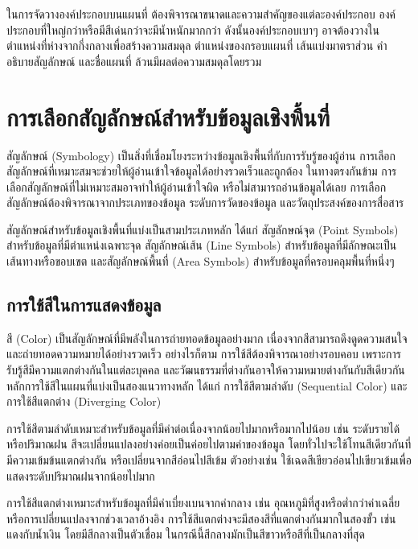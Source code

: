 ในการจัดวางองค์ประกอบบนแผนที่ ต้องพิจารณาขนาดและความสำคัญของแต่ละองค์ประกอบ องค์ประกอบที่ใหญ่กว่าหรือมีสีเด่นกว่าจะมีน้ำหนักมากกว่า ดังนั้นองค์ประกอบเบาๆ อาจต้องวางในตำแหน่งที่ห่างจากกึ่งกลางเพื่อสร้างความสมดุล ตำแหน่งของกรอบแผนที่ เส้นแบ่งมาตราส่วน คำอธิบายสัญลักษณ์ และชื่อแผนที่ ล้วนมีผลต่อความสมดุลโดยรวม

\section{การเลือกสัญลักษณ์สำหรับข้อมูลเชิงพื้นที่}

สัญลักษณ์ (Symbology) เป็นสิ่งที่เชื่อมโยงระหว่างข้อมูลเชิงพื้นที่กับการรับรู้ของผู้อ่าน การเลือกสัญลักษณ์ที่เหมาะสมจะช่วยให้ผู้อ่านเข้าใจข้อมูลได้อย่างรวดเร็วและถูกต้อง ในทางตรงกันข้าม การเลือกสัญลักษณ์ที่ไม่เหมาะสมอาจทำให้ผู้อ่านเข้าใจผิด หรือไม่สามารถอ่านข้อมูลได้เลย การเลือกสัญลักษณ์ต้องพิจารณาจากประเภทของข้อมูล ระดับการวัดของข้อมูล และวัตถุประสงค์ของการสื่อสาร

สัญลักษณ์สำหรับข้อมูลเชิงพื้นที่แบ่งเป็นสามประเภทหลัก ได้แก่ สัญลักษณ์จุด (Point Symbols) สำหรับข้อมูลที่มีตำแหน่งเฉพาะจุด สัญลักษณ์เส้น (Line Symbols) สำหรับข้อมูลที่มีลักษณะเป็นเส้นทางหรือขอบเขต และสัญลักษณ์พื้นที่ (Area Symbols) สำหรับข้อมูลที่ครอบคลุมพื้นที่หนึ่งๆ

\subsection{การใช้สีในการแสดงข้อมูล}

สี (Color) เป็นสัญลักษณ์ที่มีพลังในการถ่ายทอดข้อมูลอย่างมาก เนื่องจากสีสามารถดึงดูดความสนใจและถ่ายทอดความหมายได้อย่างรวดเร็ว อย่างไรก็ตาม การใช้สีต้องพิจารณาอย่างรอบคอบ เพราะการรับรู้สีมีความแตกต่างกันในแต่ละบุคคล และวัฒนธรรมที่ต่างกันอาจให้ความหมายต่างกันกับสีเดียวกัน หลักการใช้สีในแผนที่แบ่งเป็นสองแนวทางหลัก ได้แก่ การใช้สีตามลำดับ (Sequential Color) และการใช้สีแตกต่าง (Diverging Color)

การใช้สีตามลำดับเหมาะสำหรับข้อมูลที่มีค่าต่อเนื่องจากน้อยไปมากหรือมากไปน้อย เช่น ระดับรายได้ หรือปริมาณฝน สีจะเปลี่ยนแปลงอย่างค่อยเป็นค่อยไปตามค่าของข้อมูล โดยทั่วไปจะใช้โทนสีเดียวกันที่มีความเข้มข้นแตกต่างกัน หรือเปลี่ยนจากสีอ่อนไปสีเข้ม ตัวอย่างเช่น ใช้เฉดสีเขียวอ่อนไปเขียวเข้มเพื่อแสดงระดับปริมาณฝนจากน้อยไปมาก

การใช้สีแตกต่างเหมาะสำหรับข้อมูลที่มีค่าเบี่ยงเบนจากค่ากลาง เช่น อุณหภูมิที่สูงหรือต่ำกว่าค่าเฉลี่ย หรือการเปลี่ยนแปลงจากช่วงเวลาอ้างอิง การใช้สีแตกต่างจะมีสองสีที่แตกต่างกันมากในสองขั้ว เช่น แดงกับน้ำเงิน โดยมีสีกลางเป็นตัวเชื่อม ในกรณีนี้สีกลางมักเป็นสีขาวหรือสีที่เป็นกลางที่สุด

